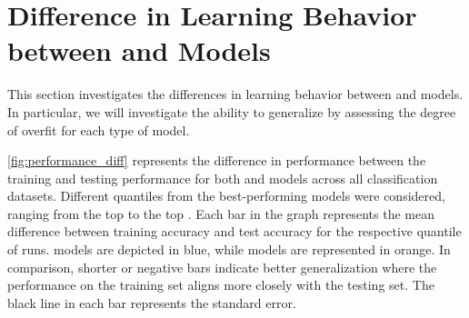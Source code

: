 \section{Difference in Learning Behavior between \gnn and \wlnn Models}
This section investigates the differences in learning behavior between \wlnn and \gnn models. In particular, we will investigate the ability to generalize by assessing the degree of overfit for each type of model.

\cref{fig:performance_diff} represents the difference in performance between the training and testing performance for both \wlnn and \gnn models across all classification datasets. Different quantiles from the best-performing models were considered, ranging from the top  to the top . Each bar in the graph represents the mean difference between training accuracy and test accuracy for the respective quantile of runs. \wlnn models are depicted in blue, while \gnn models are represented in orange. In comparison, shorter or negative bars indicate better generalization where the performance on the training set aligns more closely with the testing set. The black line in each bar represents the standard error.

